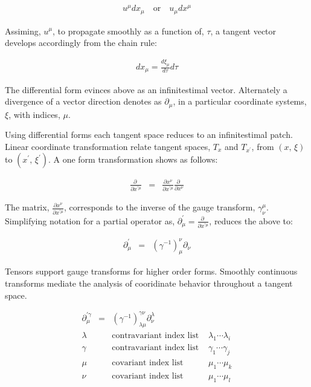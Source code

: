 \documentclass[aps,twocolumn,secnumarabic,nobalancelastpage,amsmath,amssymb,
amsthm,nofootinbib,parskip=full]{revtex4}
\numberwithin{equation}{section}
\newcommand{\pa}[1]{\left(#1\right)}
\begin{document}
\begin{equation*}
\begin{array}{c}
u^\mu dx_\mu\quad\text{or}\quad u_\mu dx^\mu
\end{array}
\end{equation*}

Assiming, $u^\mu$, to propagate smoothly as a function of, $\tau$,
a tangent vector develops accordingly from the chain rule:

\begin{equation*}
\begin{array}{c}
dx_\mu=\frac{d\xi_\mu}{d\tau}d\tau
\end{array}
\end{equation*}

The differential form evinces above as an infinitestimal vector.
Alternately a divergence of a vector direction denotes as $\partial_\mu$,
in a particular coordinate systems, $\xi$, with indices, $\mu$.

Using differential forms each tangent space reduces to an infinitestimal
patch. Linear coordinate transformation relate tangent spaces,
$T_x$ and $T_{x^\prime}$, from $\pa{x,\,\xi}$ to
$\pa{x^\prime,\,\xi^{\prime}}$. A one form transformation
shows as follows:

\begin{equation*}
\begin{array}{rcl}
\frac{\partial\;}{\partial x^{\prime\mu}}&=&
                \frac{\partial x^\nu}{\partial x^{\prime\mu}}
                      \frac{\partial\;}{\partial x^\nu}
\end{array}
\end{equation*}

The matrix, $\frac{\partial x^\nu}{\partial x^{\prime\mu}}$,
corresponds to the inverse of the gauge transform, $\gamma^\mu_\nu$.
Simplifying notation for a partial operator as,
$\partial^{\prime}_\mu=\frac{\partial\;}{\partial x^{\prime\mu}}$,
reduces the above to:

\begin{equation*}
\begin{array}{rcl}
\partial^{\prime}_\mu&=&\pa{\gamma^{-1}}^\nu_\mu\partial_\nu
\end{array}
\end{equation*}

Tensors support gauge transforms for higher order forms.
Smoothly continuous transforms mediate the analysis of cooridinate
behavior throughout a tangent space.

\begin{equation*}
\begin{array}{rcll}
\partial^{\prime\gamma}_\mu&=&
          \pa{\gamma^{-1}}^{\gamma\nu}_{\lambda\mu}\partial^\lambda_\nu & \\[11pt]
\lambda&&\text{contravariant index list }&\lambda_1\cdots\lambda_i \\[5pt]
\gamma&&\text{contravariant index list }&\gamma_1\cdots\gamma_j \\[5pt]
\mu&&\text{covariant index list }&\mu_1\cdots\mu_k \\[5pt]
\nu&&\text{covariant index list }&\mu_1\cdots\mu_l
\end{array}
\end{equation*}
\end{document}
